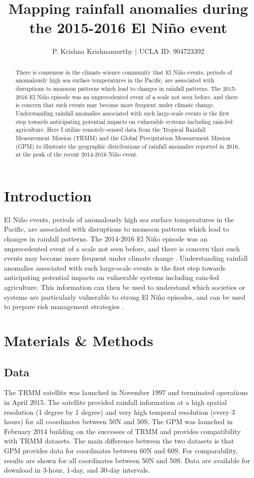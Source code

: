 \documentclass[12pt]{article}
\title{Mapping rainfall anomalies during the 2015-2016 El Ni{\~n}o event}
\author{P. Krishna Krishnamurthy | UCLA ID: 904723392}
\date{}
\begin{document}
\maketitle

\begin{abstract}
There is consensus in the climate science community that El Ni{\~n}o events, periods of anomalously high sea surface temperatures in the Pacific, are associated with disruptions to monsoon patterns which lead to changes in rainfall patterns. The 2015-2016 El Ni{\~n}o episode was an unprecedented event of a scale not seen before, and there is concern that such events may become more frequent under climate change. Understanding rainfall anomalies associated with such large-scale events is the first step towards anticipating potential impacts on vulnerable systems including rain-fed agriculture. Here I utilize remotely-sensed data from the Tropical Rainfall Measurement Mission (TRMM) and the Global Precipitation Measurement Mission (GPM) to illustrate the geographic distributions of rainfall anomalies reported in 2016, at the peak of the recent 2014-2016 Ni{\~n}o event.
\end{abstract}

\section{Introduction}
El Ni{\~n}o events, periods of anomalously high sea surface temperatures in the Pacific, are associated with disruptions to monsoon patterns which lead to changes in rainfall patterns. The 2014-2016 El Ni{\~n}o episode was an unprecedented event of a scale not seen before, and there is concern that such events may become more frequent under climate change \cite{cai2014increasing}. Understanding rainfall anomalies associated with such large-scale events is the first step towards anticipating potential impacts on vulnerable systems including rain-fed agriculture. This information can then be used to understand which societies or systems are particularly vulnerable to strong El Ni{\~n}o episodes, and can be used to prepare risk management strategies \cite{wang2017nino}. 

\section{Materials \& Methods}
\subsection{Data}
The TRMM satellite was launched in November 1997 and terminated operations in April 2015. The satellite provided rainfall information at a high spatial resolution (1 degree  by 1 degree) and very high temporal resolution (every 3 hours) for all coordinates between 50\textdegree N and 50\textdegree S. The GPM was launched in February 2014 building on the successes of TRMM and provides compatibility with TRMM datasets. The main difference between the two datasets is that GPM provides data for coordinates between 60\textdegree N and 60\textdegree S. For comparability, results are shown for all coordinates between 50\textdegree N and 50\textdegree S. Data are available for download in 3-hour, 1-day, and 30-day intervals.
\end{document}
